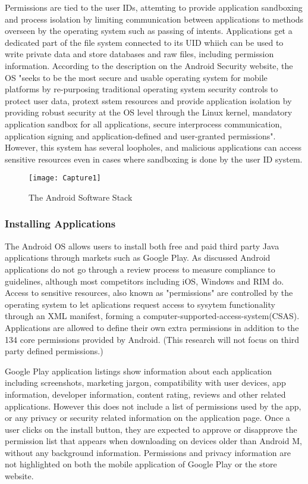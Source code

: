 Permissions are tied to the user IDs, attemting to provide application sandboxing and process isolation by limiting communication between applications to methods overseen by the operating system such as passing of intents. Applications get a dedicated part of the file system connected to its UID whiich can be used to write private data and store databases and raw files, including permission information. According to the description on the Android Security website, the OS "seeks to be the most secure and usable operating system for mobile platforms by re-purposing traditional operating system security controls to protect user data, protext sstem resources and provide application isolation by providing robust security at the OS level through the Linux kernel, mandatory application sandbox for all applications, secure interprocess communication, application signing and application-defined and user-granted permissions"\cite{diagrameka}. However, this system has several loopholes, and malicious applications can access sensitive resources even in cases where sandboxing is done by the user ID system\cite{meshram2014survey}. 
\smallskip
\begin{figure}
\texttt{[image: Capture1]}
\caption{The Android Software Stack}
\end{figure}
\smallskip

\subsubsection{Installing Applications}
The Android OS allows users to install both free and paid third party Java applications through markets such as Google Play. As discussed Android applications do not go through a review process to measure compliance to guidelines, although most competitors including iOS, Windows and RIM do. Access to sensitive resources, also known as "permissions" are controlled by the operating system to let aplications request access to sysytem functionality through an XML manifest, forming a computer-supported-access-system(CSAS)\cite{stevens2009computer}. Applications are allowed to define their own extra permissions in addition to the 134 core permissions provided by Android\cite{a}. (This research will not focus on third party defined permissions.)
\smallskip

Google Play application listings show information about each application including screenshots, marketing jargon, compatibility with user devices, app information, developer information, content rating, reviews and other related applications. However this does not include a list of permissions used by the app, or any privacy or security related information on the application page. Once a user clicks on the install button, they are expected to approve or disapprove the permission list that appears when downloading on devices older than Android M, without any background information. Permissions and privacy information are not highlighted on both the mobile application of Google Play or the store website\cite{kelley2013privacy}. 

